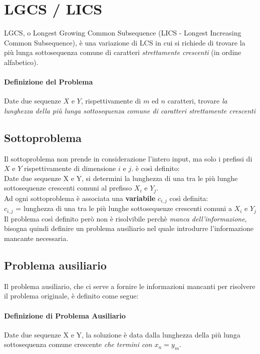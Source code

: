 \documentclass[12pt, a4paper, openany]{book}
\begin{document}
\section{LGCS / LICS} %
LGCS, o Longest Growing Common Subsequence (LICS - Longest Increasing Common Subsequence), è una variazione di LCS in cui si richiede
di trovare la più lunga sottosequenza comune di caratteri \emph{strettamente crescenti} (in ordine alfabetico).

\paragraph*{Definizione del Problema}
Date due sequenze $X$ e $Y$, rispettivamente di $m$ ed $n$ caratteri, trovare \emph{la lunghezza della più lunga sottosequenza comune di caratteri strettamente crescenti}

\subsection*{Sottoproblema}
Il sottoproblema non prende in considerazione l'intero input, ma solo i prefissi di $X$ e $Y$ rispettivamente di dimensione $i$ e $j$.
è così definito:
\\Date due sequenze X e Y, si determini la lunghezza di una tra le più lunghe sottosequenze crescenti comuni al prefisso $X_i$ e $Y_j$.
\\Ad ogni sottoproblema è associata una \textbf{variabile} $c_{i,j}$ così definita:
\\$c_{i,j}$ = lunghezza di una tra le più lunghe sottosequenze crescenti comuni a $X_i$ e $Y_j$
\\Il problema così definito però non è risolvibile perchè \emph{manca dell'informazione}, bisogna quindi definire un problema ausiliario nel quale introdurre l'informazione mancante necessaria.

\subsection*{Problema ausiliario}
Il problema ausiliario, che ci serve a fornire le informazioni mancanti per risolvere il problema originale, è definito come segue:

\paragraph*{Definizione di Problema Ausiliario}
Date due sequenze X e Y, la soluzione è data dalla lunghezza della più lunga sottosequenza comune crescente \emph{che termini con $x_n =y_m$}.
\end{document}
